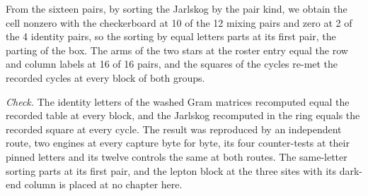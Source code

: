 \begin{chproof}[exact]
From the sixteen pairs, by sorting the Jarlskog by the pair kind, we obtain the cell nonzero with the checkerboard at 10 of the 12 mixing pairs and zero at 2 of the 4 identity pairs, so the sorting by equal letters parts at its first pair, the parting of the box. The arms of the two stars at the roster entry equal the row and column labels at 16 of 16 pairs, and the squares of the cycles re-met the recorded cycles at every block of both groups.

\emph{Check.} The identity letters of the washed Gram matrices recomputed equal the recorded table at every block, and the Jarlskog recomputed in the ring equals the recorded square at every cycle. The result was reproduced by an independent route, two engines at every capture byte for byte, its four counter-tests at their pinned letters and its twelve controls the same at both routes.
The same-letter sorting parts at its first pair, and the lepton block at the three sites with its dark-end column is placed at no chapter here.
\end{chproof}
\label{chend:VI-7-D538947-w-ckmb}
